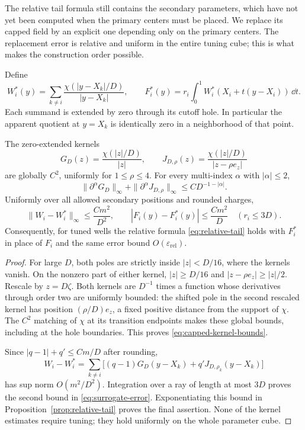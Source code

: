 The relative tail formula still contains the secondary parameters, which
have not yet been computed when the primary centers must be placed. We
replace its capped field by an explicit one depending only on the primary
centers. The replacement error is relative and uniform in the entire
tuning cube; this is what makes the construction order possible.

Define
\begin{equation}
 W_i^*(y)=\sum_{k\ne i}\frac{\chi(|y-X_k|/D)}{|y-X_k|},\qquad
 F_i^*(y)=r_i\int_0^1W_i^*(X_i+t(y-X_i))\,\dd t.
 \label{eq:surrogate-field}
\end{equation}
Each summand is extended by zero through its cutoff hole.  In
particular the apparent quotient at $y=X_k$ is identically zero
in a neighborhood of that point.

\begin{lemma}
\label{lem:surrogate}
The zero-extended kernels
\[
 G_D(z)=\frac{\chi(|z|/D)}{|z|},\qquad
 J_{D,\rho}(z)=\frac{\chi(|z|/D)}{|z-\rho e_z|}
\]
are globally $C^2$, uniformly for $1\le\rho\le4$.  For every
multi-index $\alpha$ with $|\alpha|\le2$,
\begin{equation}
 \|\partial^\alpha G_D\|_\infty+
 \|\partial^\alpha J_{D,\rho}\|_\infty
 \le C D^{-1-|\alpha|}.
 \label{eq:capped-kernel-bounds}
\end{equation}
Uniformly over all allowed secondary positions and rounded charges,
\begin{equation}
 \|W_i-W_i^*\|_\infty\le\frac{Cm^2}{D^2},\qquad
 |F_i(y)-F_i^*(y)|\le\frac{Cm^2}{D}\quad(r_i\le3D).
 \label{eq:surrogate-error}
\end{equation}
Consequently, for tuned wells the relative formula
\eqref{eq:relative-tail} holds with $F_i^*$ in place of $F_i$ and
the same error bound $O(\varepsilon_{\mathrm{rel}})$.
\end{lemma}

\begin{proof}
For large $D$, both poles are strictly inside $|z|<D/16$, where
the kernels vanish.  On the nonzero part of either kernel,
$|z|\ge D/16$ and $|z-\rho e_z|\ge |z|/2$.  Rescale by $z=D\zeta$.
Both kernels are $D^{-1}$ times a function whose derivatives through
order two are uniformly bounded: the shifted pole in the second
rescaled kernel has position $(\rho/D)e_z$, a fixed positive
distance from the support of $\chi$.  The $C^2$ matching of $\chi$
at its transition endpoints makes these global bounds, including
at the hole boundaries.  This proves \eqref{eq:capped-kernel-bounds}.

Since $|q-1|+q'\le Cm/D$ after rounding,
\[
 W_i-W_i^*=
  \sum_{k\ne i}\bigl[(q-1)G_D(y-X_k)
                  +q'J_{D,\rho_k}(y-X_k)\bigr]
\]
has sup norm $O(m^2/D^2)$.  Integration over a ray of length at
most $3D$ proves the second bound in \eqref{eq:surrogate-error}.
Exponentiating this bound in Proposition~\ref{prop:relative-tail}
proves the final assertion.  None of the kernel estimates require
tuning; they hold uniformly on the whole parameter cube.
\end{proof}

